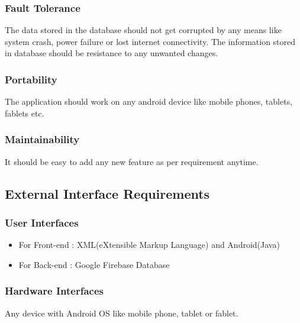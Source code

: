 \documentclass{report}
\begin{document}
\subsubsection{Fault Tolerance}
The data stored in the database should not get corrupted by any means like system crash, power failure or lost internet connectivity. The information stored in database should be resistance to any unwanted changes.

\subsubsection{Portability}
The application should work on any android device like mobile phones, tablets, fablets etc.

\subsubsection{Maintainability}
It should be easy to add any new feature as per requirement anytime.

\subsection{External Interface Requirements}
\subsubsection{User Interfaces}

\begin{itemize}
\renewcommand{\labelitemi}{$\rightarrow$}
\item For Front-end : XML(eXtensible Markup Language) and Android(Java)
\item For Back-end : Google Firebase Database            
\end{itemize}

\subsubsection{Hardware Interfaces}
Any device with Android OS like mobile phone, tablet or fablet.
\end{document}
